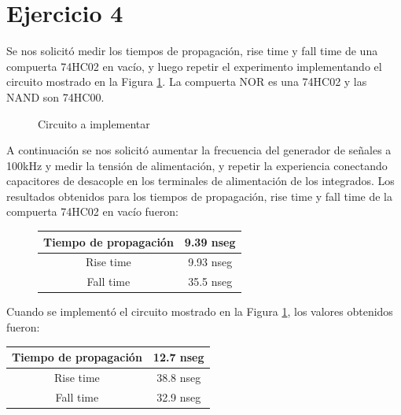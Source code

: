 \part*{Ejercicio 4}

Se nos solicitó medir los tiempos de propagación, rise time y fall time de una compuerta 74HC02 en vacío, y luego repetir el experimento implementando el circuito mostrado en la Figura \ref{4_fig3}. La compuerta NOR es una 74HC02 y las NAND son 74HC00.
%

\begin{figure}
\begin{center}
\resizebox{.5\linewidth}{!}{\parbox{\linewidth}{}}
\caption{Circuito a implementar}
\label{4_fig3}
\end{center}
\end{figure}

A continuación se nos solicitó aumentar la frecuencia del generador de señales a 100kHz y medir la tensión de alimentación, y repetir la experiencia conectando capacitores de desacople en los terminales de alimentación de los integrados.
Los resultados obtenidos para los tiempos de propagación, rise time y fall time de la compuerta 74HC02 en vacío fueron:

\begin{figure}[H]
\begin{flushright}
\begin{tabular}{|c|c|}
\hline 
Tiempo de propagación & 9.39 nseg \\ 
\hline 
Rise time & 9.93 nseg \\ 
\hline 
Fall time & 35.5 nseg \\ 
\hline 
\end{tabular}
\end{flushright}
\end{figure}

Cuando se implementó el circuito mostrado en la Figura \ref{4_fig3}, los valores obtenidos fueron:

\begin{center}
\begin{tabular}{|c|c|}
\hline 
Tiempo de propagación & 12.7 nseg \\ 
\hline 
Rise time & 38.8 nseg \\ 
\hline 
Fall time & 32.9 nseg \\ 
\hline 
\end{tabular}
\end{center}

